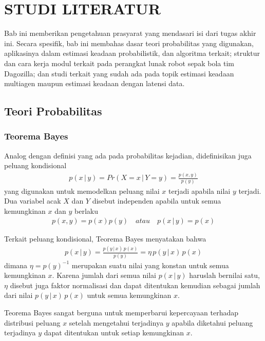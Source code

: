 \chapter{STUDI LITERATUR}

Bab ini memberikan pengetahuan prasyarat yang mendasari isi dari tugas akhir ini. Secara spesifik, bab ini membahas dasar teori probabilitas yang digunakan, aplikasinya dalam estimasi keadaan probabilistik, dan algoritma terkait; struktur dan cara kerja modul terkait pada perangkat lunak robot sepak bola tim Dagozilla; dan studi terkait yang sudah ada pada topik estimasi keadaan multiagen maupun estimasi keadaan dengan latensi data.

\section{Teori Probabilitas}

\subsection{Teorema Bayes}
Analog dengan definisi yang ada pada probabilitas kejadian, didefinisikan juga peluang kondisional
\begin{align}
    p(x \,|\, y) = Pr(X = x \,|\, Y = y) = \frac{p(x, y)}{p(y)}
\end{align}
yang digunakan untuk memodelkan peluang nilai $x$ terjadi apabila nilai $y$ terjadi. Dua variabel acak $X$ dan $Y$ disebut independen apabila untuk semua kemungkinan $x$ dan $y$ berlaku
\begin{align}
    p(x, y) = p(x) p(y) \quad\textit{atau}\quad p(x \,|\, y) = p(x)
\end{align}

Terkait peluang kondisional, Teorema Bayes menyatakan bahwa
\begin{align}
    p(x \,|\, y) = \frac{p(y \,|\, x)\, p(x)}{p(y)} = \eta\, p(y \,|\, x)\, p(x)
\end{align}
dimana $\eta = p(y)^{-1}$ merupakan suatu nilai yang konstan untuk semua kemungkinan $x$. Karena jumlah dari semua nilai $p(x \,|\, y)$ haruslah bernilai satu, $\eta$ disebut juga faktor normalisasi dan dapat ditentukan kemudian sebagai jumlah dari nilai $p(y \,|\, x)\, p(x)$ untuk semua kemungkinan $x$.

Teorema Bayes sangat berguna untuk memperbarui kepercayaan terhadap distribusi peluang $x$ setelah mengetahui terjadinya $y$ apabila diketahui peluang terjadinya $y$ dapat ditentukan untuk setiap kemungkinan $x$.

